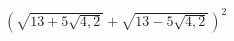 \begin{ex}[type=expression]
	\begin{condition}
		\( (\sqrt{13+5\sqrt{4,2}}+\sqrt{13-5\sqrt{4,2}})^2 \)
	\end{condition}
\end{ex}